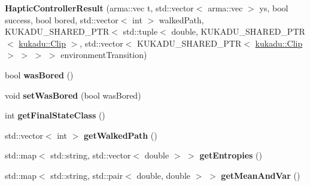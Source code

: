\begin{DoxyCompactItemize}
\item 
{\bfseries Haptic\+Controller\+Result} (arma\+::vec t, std\+::vector$<$ arma\+::vec $>$ ys, bool success, bool bored, std\+::vector$<$ int $>$ walked\+Path, K\+U\+K\+A\+D\+U\+\_\+\+S\+H\+A\+R\+E\+D\+\_\+\+P\+TR$<$ std\+::tuple$<$ double, K\+U\+K\+A\+D\+U\+\_\+\+S\+H\+A\+R\+E\+D\+\_\+\+P\+TR$<$ \hyperlink{classkukadu_1_1Clip}{kukadu\+::\+Clip} $>$, std\+::vector$<$ K\+U\+K\+A\+D\+U\+\_\+\+S\+H\+A\+R\+E\+D\+\_\+\+P\+TR$<$ \hyperlink{classkukadu_1_1Clip}{kukadu\+::\+Clip} $>$ $>$ $>$ $>$ environment\+Transition)\hypertarget{classkukadu_1_1HapticControllerResult_a47345ffc29dd31ecb607327272e22f77}{}\label{classkukadu_1_1HapticControllerResult_a47345ffc29dd31ecb607327272e22f77}

\item 
bool {\bfseries was\+Bored} ()\hypertarget{classkukadu_1_1HapticControllerResult_a9de0d818f4846a50824982a206093174}{}\label{classkukadu_1_1HapticControllerResult_a9de0d818f4846a50824982a206093174}

\item 
void {\bfseries set\+Was\+Bored} (bool was\+Bored)\hypertarget{classkukadu_1_1HapticControllerResult_a41168ae19f32a8718ce596b754fe2b60}{}\label{classkukadu_1_1HapticControllerResult_a41168ae19f32a8718ce596b754fe2b60}

\item 
int {\bfseries get\+Final\+State\+Class} ()\hypertarget{classkukadu_1_1HapticControllerResult_adfc6e0fc926a70efe4f0fe385a841203}{}\label{classkukadu_1_1HapticControllerResult_adfc6e0fc926a70efe4f0fe385a841203}

\item 
std\+::vector$<$ int $>$ {\bfseries get\+Walked\+Path} ()\hypertarget{classkukadu_1_1HapticControllerResult_ad22c014f12ae0bff2c24edc4cce7fd32}{}\label{classkukadu_1_1HapticControllerResult_ad22c014f12ae0bff2c24edc4cce7fd32}

\item 
std\+::map$<$ std\+::string, std\+::vector$<$ double $>$ $>$ {\bfseries get\+Entropies} ()\hypertarget{classkukadu_1_1HapticControllerResult_a5019187d52615705b23481128de8ef17}{}\label{classkukadu_1_1HapticControllerResult_a5019187d52615705b23481128de8ef17}

\item 
std\+::map$<$ std\+::string, std\+::pair$<$ double, double $>$ $>$ {\bfseries get\+Mean\+And\+Var} ()\hypertarget{classkukadu_1_1HapticControllerResult_a8897bf6371b7f8a1624dc9f0d5f4248f}{}\label{classkukadu_1_1HapticControllerResult_a8897bf6371b7f8a1624dc9f0d5f4248f}


\end{DoxyCompactItemize}
